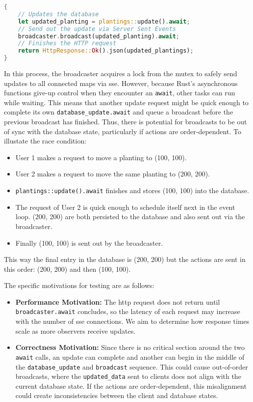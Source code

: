 \documentclass[final,draft,oneside]{vutinfth}
\begin{document}
\begin{lstlisting}[language=rust]
{
    // Updates the database
    let updated_planting = plantings::update().await;
    // Send out the update via Server Sent Events
    broadcaster.broadcast(updated_planting).await;
    // Finishes the HTTP request
    return HttpResponse::Ok().json(updated_plantings);
}
\end{lstlisting}

In this process, the broadcaster acquires a lock from the mutex to safely send updates to all connected maps via \gls{sse}. However, because Rust's asynchronous functions give-up control when they encounter an \texttt{await}, other tasks can run while waiting.
This means that another update request might be quick enough to complete its own \texttt{database\_update.await} and queue a broadcast before the previous broadcast has finished.
Thus, there is potential for broadcasts to be out of sync with the database state, particularly if actions are order-dependent.
To illustate the race condition:
\begin{itemize}
    \item User 1 makes a request to move a planting to (100, 100).
    \item User 2 makes a request to move the same planting to (200, 200).
    \item \texttt{plantings::update().await} finishes and stores (100, 100) into the database.
    \item The request of User 2 is quick enough to schedule itself next in the event loop. (200, 200) are both persisted to the database and also sent out via the broadcaster.
    \item Finally (100, 100) is sent out by the broadcaster.
\end{itemize}

This way the final entry in the database is (200, 200) but the actions are sent in this order: (200, 200) and then (100, 100).

The specific motivations for testing are as follows:
\begin{itemize}
    \item \textbf{Performance Motivation:} The \gls{http} request does not return until \texttt{broadcaster.await} concludes, so the latency of each request may increase with the number of \gls{sse} connections.
    We aim to determine how response times scale as more observers receive updates.
    \item \textbf{Correctness Motivation:} Since there is no critical section around the two \texttt{await} calls, an update can complete and another can begin in the middle of the \texttt{database\_update} and \texttt{broadcast} sequence.
    This could cause out-of-order broadcasts, where the \texttt{updated\_data} sent to clients does not align with the current database state.
    If the actions are order-dependent, this misalignment could create inconsistencies between the client and database states.
\end{itemize}
\end{document}
